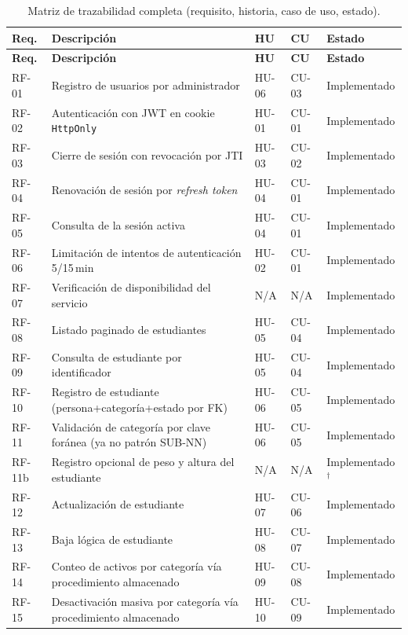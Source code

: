 \documentclass[11pt,a4paper]{article}
\begin{document}
\scriptsize
\begin{longtable}{@{}p{1.5cm}p{6.3cm}p{1.4cm}p{1.4cm}p{2.1cm}@{}}
\caption{Matriz de trazabilidad completa (requisito, historia, caso de uso, estado).\label{tab:matriz-completa}}\\
\toprule
\textbf{Req.} & \textbf{Descripción} & \textbf{HU} & \textbf{CU} & \textbf{Estado} \\
\midrule
\endfirsthead
\toprule
\textbf{Req.} & \textbf{Descripción} & \textbf{HU} & \textbf{CU} & \textbf{Estado} \\
\midrule
\endhead
RF-01 & Registro de usuarios por administrador & HU-06 & CU-03 & Implementado \\
RF-02 & Autenticación con JWT en cookie \texttt{HttpOnly} & HU-01 & CU-01 & Implementado \\
RF-03 & Cierre de sesión con revocación por JTI & HU-03 & CU-02 & Implementado \\
RF-04 & Renovación de sesión por \emph{refresh token} & HU-04 & CU-01 & Implementado \\
RF-05 & Consulta de la sesión activa & HU-04 & CU-01 & Implementado \\
RF-06 & Limitación de intentos de autenticación 5/15\,min & HU-02 & CU-01 & Implementado \\
RF-07 & Verificación de disponibilidad del servicio & N/A & N/A & Implementado \\
RF-08 & Listado paginado de estudiantes & HU-05 & CU-04 & Implementado \\
RF-09 & Consulta de estudiante por identificador & HU-05 & CU-04 & Implementado \\
RF-10 & Registro de estudiante (persona+categoría+estado por FK) & HU-06 & CU-05 & Implementado \\
RF-11 & Validación de categoría por clave foránea (ya no patrón SUB-NN) & HU-06 & CU-05 & Implementado \\
RF-11b & Registro opcional de peso y altura del estudiante & N/A & N/A & Implementado$^\dagger$ \\
RF-12 & Actualización de estudiante & HU-07 & CU-06 & Implementado \\
RF-13 & Baja lógica de estudiante & HU-08 & CU-07 & Implementado \\
RF-14 & Conteo de activos por categoría vía procedimiento almacenado & HU-09 & CU-08 & Implementado \\
RF-15 & Desactivación masiva por categoría vía procedimiento almacenado & HU-10 & CU-09 & Implementado \\

\end{longtable}
\end{document}
